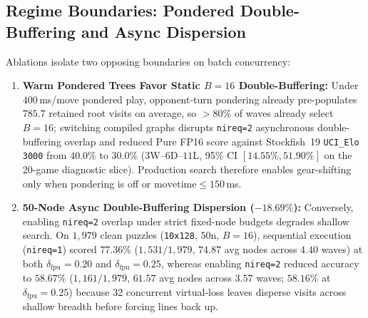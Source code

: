 \documentclass[10pt,twocolumn]{article}
\begin{document}
\subsection{Regime Boundaries: Pondered Double-Buffering and Async Dispersion}
Ablations isolate two opposing boundaries on batch concurrency:
\begin{enumerate}
  \item \textbf{Warm Pondered Trees Favor Static $B=16$ Double-Buffering:} Under $400$\,ms/move pondered play, opponent-turn pondering already pre-populates $785.7$ retained root visits on average, so $>80\%$ of waves already select $B=16$; switching compiled graphs disrupts \texttt{nireq=2} asynchronous double-buffering overlap and reduced Pure FP16 score against Stockfish~19 \texttt{UCI\_Elo 3000} from $40.0\%$ to $30.0\%$ ($3\text{W}\text{--}6\text{D}\text{--}11\text{L}$, 95\% CI $[14.55\%, 51.90\%]$ on the 20-game diagnostic slice). Production search therefore enables gear-shifting only when pondering is off or $\text{movetime} \le 150$\,ms.
  \item \textbf{50-Node Async Double-Buffering Dispersion ($-18.69\%$):} Conversely, enabling \texttt{nireq=2} overlap under strict fixed-node budgets degrades shallow search. On $1{,}979$ clean puzzles (\texttt{10x128}, $50\text{n}$, $B=16$), sequential execution (\texttt{nireq=1}) scored $77.36\%$ ($1{,}531/1{,}979$, $74.87$ avg nodes across $4.40$ waves) at both $\delta_{\mathrm{fpu}}=0.20$ and $\delta_{\mathrm{fpu}}=0.25$, whereas enabling \texttt{nireq=2} reduced accuracy to $58.67\%$ ($1{,}161/1{,}979$, $61.57$ avg nodes across $3.57$ waves; $58.16\%$ at $\delta_{\mathrm{fpu}}=0.25$) because 32 concurrent virtual-loss leaves disperse visits across shallow breadth before forcing lines back up.
\end{enumerate}
\end{document}
